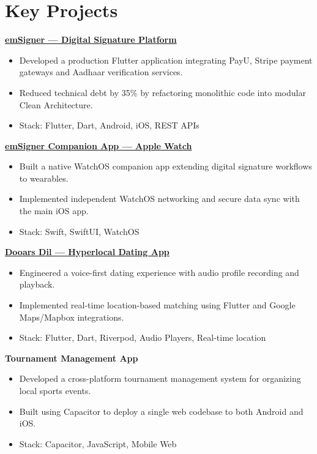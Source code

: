\documentclass[10pt, letterpaper]{article}
\newenvironment{tightitem}{
    \begin{itemize}[topsep=0pt, itemsep=0pt, parsep=0.3pt, leftmargin=10pt]
}{
    \end{itemize}
}
\begin{document}
\section{Key Projects}

\href{https://play.google.com/store/apps/details?id=com.emudhra.emSigner&hl=en_IN}{\textbf{emSigner — Digital Signature Platform}}  
\begin{tightitem}
\item Developed a production Flutter application integrating PayU, Stripe payment gateways and Aadhaar verification services.
\item Reduced technical debt by 35\% by refactoring monolithic code into modular Clean Architecture.
\item Stack: Flutter, Dart, Android, iOS, REST APIs
\end{tightitem}

\href{https://apps.apple.com/jp/app/emsigner-sign-electronically/id1246670687?l=en-US&platform=watch}{\textbf{emSigner Companion App — Apple Watch}}  
\begin{tightitem}
\item Built a native WatchOS companion app extending digital signature workflows to wearables.
\item Implemented independent WatchOS networking and secure data sync with the main iOS app.
\item Stack: Swift, SwiftUI, WatchOS
\end{tightitem}

\href{https://github.com/RoyRoki/Dooars_Dil}{\textbf{Dooars Dil — Hyperlocal Dating App}}  
\begin{tightitem}
\item Engineered a voice-first dating experience with audio profile recording and playback.
\item Implemented real-time location-based matching using Flutter and Google Maps/Mapbox integrations.
\item Stack: Flutter, Dart, Riverpod, Audio Players, Real-time location
\end{tightitem}

\textbf{Tournament Management App}  
\begin{tightitem}
\item Developed a cross-platform tournament management system for organizing local sports events.
\item Built using Capacitor to deploy a single web codebase to both Android and iOS.
\item Stack: Capacitor, JavaScript, Mobile Web
\end{tightitem}
\end{document}
